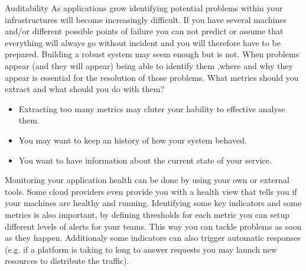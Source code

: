 \begin{pattern}{Auditability}
    \context
        As applications grow identifying potential problems within your infrastructures will become increasingly difficult. If you have several machines and/or different possible points of failure you can not predict or assume that everything will always go without incident and you will therefore have to be prepared. Building a robust system may seem enough but is not. When problems appear (and they will appear) being able to identify them ,where and why they appear is essential for the resolution of those problems.
    \problem
        What metrics should you extract and what should you do with them?
    \forces
        \begin{itemize}
            \item Extracting too many metrics may cluter your hability to effective analyse them.
            \item You may want to keep an history of how your system behaved.
            \item You want to have information about the current state of your service.
        \end{itemize}

    \solution
        Monitoring your application health can be done by using your own or external tools. Some cloud providers even provide you with a health view that tells you if your machines are healthy and running.
        Identifying some key indicators and some metrics is also important, by defining thresholds for each metric you can setup different levels of alerts for your teams. This way you can tackle problems as soon as they happen. Additionaly some indicators can also trigger automatic responses (e.g. if a platform is taking to long to answer requests you may launch new resources to distribute the traffic).
\end{pattern}




